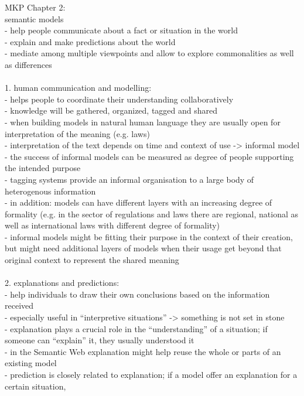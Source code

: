MKP Chapter 2: \\
semantic models \\
- help people communicate about a fact or situation in the world \\
- explain and make predictions about the world \\
- mediate among multiple viewpoints and allow to explore commonalities as well as differences \\
\\
1. human communication and modelling: \\
- helps people to coordinate their understanding collaboratively \\
- knowledge will be gathered, organized, tagged and shared \\
- when building models in natural human language they are usually open for interpretation of the meaning (e.g. laws)  \\
- interpretation of the text depends on time and context of use -> informal model \\
- the success of informal models can be measured as degree of people supporting the intended purpose \\
- tagging systems provide an informal organisation to a large body of heterogenous information \\
- in addition: models can have different layers with an increasing degree of formality (e.g. in the sector of regulations
and laws there are regional, national as well as international laws with different degree of formality) \\
- informal models might be fitting their purpose in the context of their creation, but might need additional layers of models
when their usage get beyond that original context to represent the shared meaning \\
\\
2. explanations and predictions: \\
- help individuals to draw their own conclusions based on the information received \\
- especially useful in ``interpretive situations'' -> something is not set in stone \\
- explanation plays a crucial role in the ``understanding'' of a situation; if someone can ``explain'' it,
they usually understood it \\
- in the Semantic Web explanation might help reuse the whole or parts of an existing model \\
- prediction is closely related to explanation; if a model offer an explanation for a certain situation,
